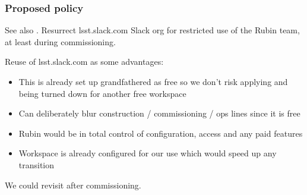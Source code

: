 \subsubsection{Proposed policy}
See also .
Resurrect lsst.slack.com Slack org for restricted use of the Rubin team, at least during commissioning.

Reuse of lsst.slack.com as some advantages:

\begin{itemize}
\item  This is already set up grandfathered as free so we don't risk applying and being turned down for another free workspace
\item  Can deliberately blur construction / commissioning / ops lines since it is free
\item  Rubin would be in total control of configuration, access and any paid features
\item  Workspace is already configured for our use which would speed up any transition

\end{itemize}
We could revisit after commissioning.
